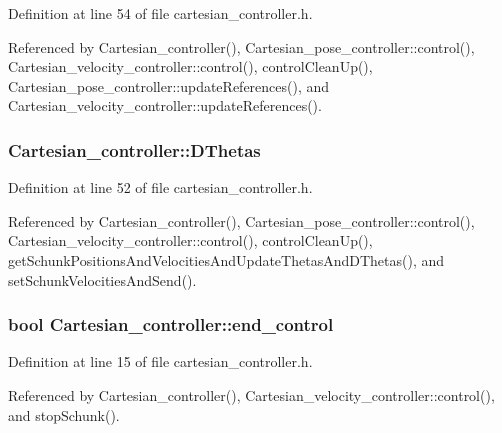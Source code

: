 Definition at line 54 of file cartesian\-\_\-controller.\-h.



Referenced by Cartesian\-\_\-controller(), Cartesian\-\_\-pose\-\_\-controller\-::control(), Cartesian\-\_\-velocity\-\_\-controller\-::control(), control\-Clean\-Up(), Cartesian\-\_\-pose\-\_\-controller\-::update\-References(), and Cartesian\-\_\-velocity\-\_\-controller\-::update\-References().

\hypertarget{classCartesian__controller_a5d6419e62e130150edfcbd82b1dadcae}{
\subsubsection[{D\-Thetas}]{ Cartesian\-\_\-controller\-::\-D\-Thetas\hspace{0.3cm}{\ttfamily [protected]}}}\label{classCartesian__controller_a5d6419e62e130150edfcbd82b1dadcae}


Definition at line 52 of file cartesian\-\_\-controller.\-h.



Referenced by Cartesian\-\_\-controller(), Cartesian\-\_\-pose\-\_\-controller\-::control(), Cartesian\-\_\-velocity\-\_\-controller\-::control(), control\-Clean\-Up(), get\-Schunk\-Positions\-And\-Velocities\-And\-Update\-Thetas\-And\-D\-Thetas(), and set\-Schunk\-Velocities\-And\-Send().

\hypertarget{classCartesian__controller_a3c0a72214891f68e2bad63bf2b688f9c}{
\subsubsection[{end\-\_\-control}]{\setlength{\rightskip}{0pt plus 5cm}bool Cartesian\-\_\-controller\-::end\-\_\-control\hspace{0.3cm}{\ttfamily [protected]}}}\label{classCartesian__controller_a3c0a72214891f68e2bad63bf2b688f9c}


Definition at line 15 of file cartesian\-\_\-controller.\-h.



Referenced by Cartesian\-\_\-controller(), Cartesian\-\_\-velocity\-\_\-controller\-::control(), and stop\-Schunk().


